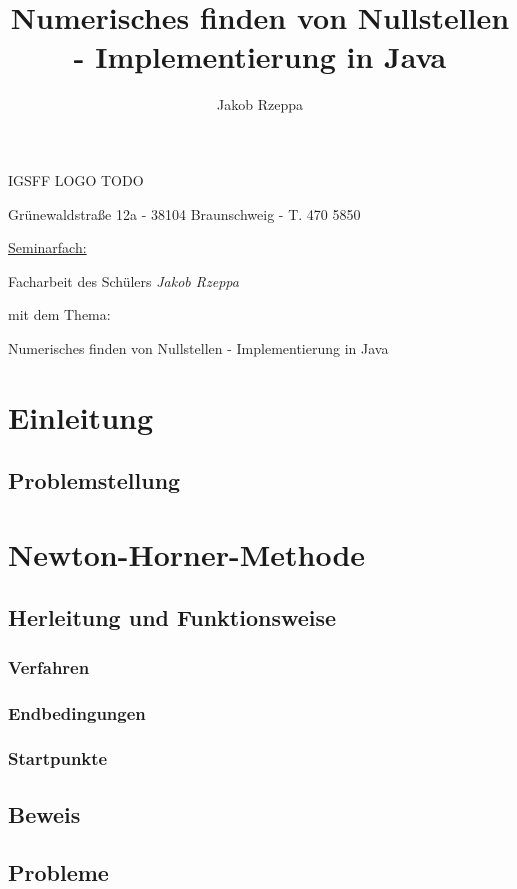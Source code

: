 \documentclass[12pt]{article}
\title{Numerisches finden von Nullstellen - Implementierung in Java}
\author{Jakob Rzeppa}
\begin{document}
\begin{titlepage}
	\centering
    {\huge IGSFF LOGO TODO\par}
	{Grünewaldstraße 12a - 38104 Braunschweig - T. 470 5850\par}
	\vspace{1cm}
	{\underline{Seminarfach:}\par}
	\vspace{1cm}
    {\large Facharbeit des Schülers \textit{Jakob Rzeppa} \par mit dem Thema: \par}
    \vspace{1.5cm}
	{\huge Numerisches finden von Nullstellen - Implementierung in Java\par}
	\vspace{2cm}
\end{titlepage}

\tableofcontents

\section{Einleitung}
    \subsection{Problemstellung}

\section{Newton-Horner-Methode}
    \subsection{Herleitung und Funktionsweise}
    \subsubsection{Verfahren}
    \subsubsection{Endbedingungen}
    \subsubsection{Startpunkte}
    \subsection{Beweis}
    \subsection{Probleme}
\end{document}
